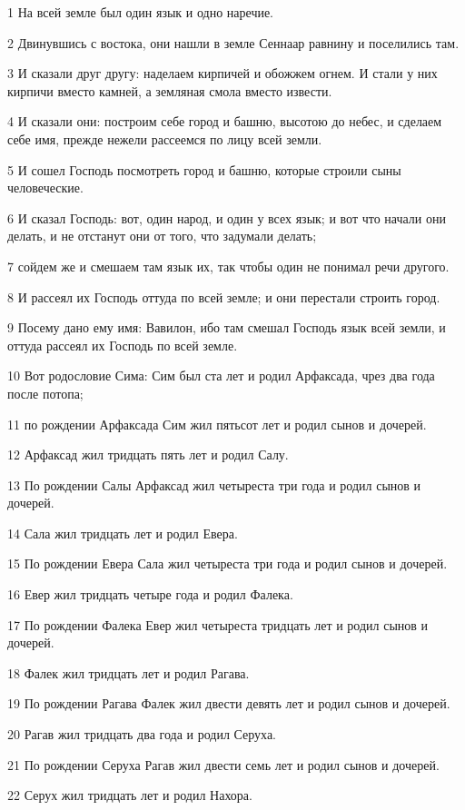 \par 1 На всей земле был один язык и одно наречие.
\par 2 Двинувшись с востока, они нашли в земле Сеннаар равнину и поселились там.
\par 3 И сказали друг другу: наделаем кирпичей и обожжем огнем. И стали у них кирпичи вместо камней, а земляная смола вместо извести.
\par 4 И сказали они: построим себе город и башню, высотою до небес, и сделаем себе имя, прежде нежели рассеемся по лицу всей земли.
\par 5 И сошел Господь посмотреть город и башню, которые строили сыны человеческие.
\par 6 И сказал Господь: вот, один народ, и один у всех язык; и вот что начали они делать, и не отстанут они от того, что задумали делать;
\par 7 сойдем же и смешаем там язык их, так чтобы один не понимал речи другого.
\par 8 И рассеял их Господь оттуда по всей земле; и они перестали строить город.
\par 9 Посему дано ему имя: Вавилон, ибо там смешал Господь язык всей земли, и оттуда рассеял их Господь по всей земле.
\par 10 Вот родословие Сима: Сим был ста лет и родил Арфаксада, чрез два года после потопа;
\par 11 по рождении Арфаксада Сим жил пятьсот лет и родил сынов и дочерей.
\par 12 Арфаксад жил тридцать пять лет и родил Салу.
\par 13 По рождении Салы Арфаксад жил четыреста три года и родил сынов и дочерей.
\par 14 Сала жил тридцать лет и родил Евера.
\par 15 По рождении Евера Сала жил четыреста три года и родил сынов и дочерей.
\par 16 Евер жил тридцать четыре года и родил Фалека.
\par 17 По рождении Фалека Евер жил четыреста тридцать лет и родил сынов и дочерей.
\par 18 Фалек жил тридцать лет и родил Рагава.
\par 19 По рождении Рагава Фалек жил двести девять лет и родил сынов и дочерей.
\par 20 Рагав жил тридцать два года и родил Серуха.
\par 21 По рождении Серуха Рагав жил двести семь лет и родил сынов и дочерей.
\par 22 Серух жил тридцать лет и родил Нахора.
